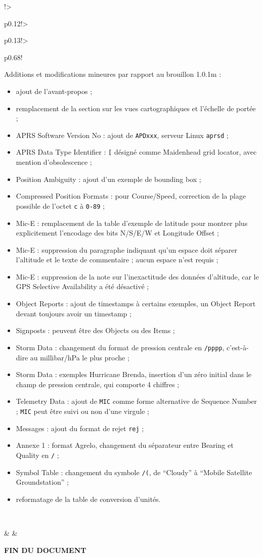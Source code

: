 {\begin{longtable}{!{\vrule}>{\raggedright\arraybackslash}p{0.12\linewidth}!{\vrule}>{\raggedright\arraybackslash}p{0.13\linewidth}!{\vrule}>{\raggedright\arraybackslash}p{0.68\linewidth}!{\vrule}}
\begin{minipage}[t]{\linewidth}
Additions et modifications mineures par rapport au brouillon 1.0.1m :
\begin{itemize}
\setlength{\itemsep}{0pt}
\setlength{\parsep}{0pt}
\setlength{\topsep}{2pt}
\item ajout de l'avant-propos ; 
\item remplacement de la section sur les vues cartographiques et l'échelle de portée ; 
\item APRS Software Version No : ajout de \texttt{APDxxx}, serveur Linux \texttt{aprsd} ; 
\item APRS Data Type Identifier : \texttt{[} désigné comme Maidenhead grid locator, avec mention d'obsolescence ; 
\item Position Ambiguity : ajout d'un exemple de bounding box ; 
\item Compressed Position Formats : pour Course/Speed, correction de la plage possible de l'octet \texttt{c} à \texttt{0-89} ; 
\item Mic-E : remplacement de la table d'exemple de latitude pour montrer plus explicitement l'encodage des bits N/S/E/W et Longitude Offset ; 
\item Mic-E : suppression du paragraphe indiquant qu'un espace doit séparer l'altitude et le texte de commentaire ; aucun espace n'est requis ; 
\item Mic-E : suppression de la note sur l'inexactitude des données d'altitude, car le GPS Selective Availability a été désactivé ; 
\item Object Reports : ajout de timestamps à certains exemples, un Object Report devant toujours avoir un timestamp ; 
\item Signposts : peuvent être des Objects ou des Items ; 
\item Storm Data : changement du format de pression centrale en \texttt{/pppp}, c'est-à-dire au millibar/hPa le plus proche ; 
\item Storm Data : exemples Hurricane Brenda, insertion d'un zéro initial dans le champ de pression centrale, qui comporte 4 chiffres ; 
\item Telemetry Data : ajout de \texttt{MIC} comme forme alternative de Sequence Number ; \texttt{MIC} peut être suivi ou non d'une virgule ; 
\item Messages : ajout du format de rejet \texttt{rej} ; 
\item Annexe 1 : format Agrelo, changement du séparateur entre Bearing et Quality en \texttt{/} ; 
\item Symbol Table : changement du symbole \texttt{/(}, de ``Cloudy'' à ``Mobile Satellite Groundstation'' ; 
\item reformatage de la table de conversion d'unités. 
\end{itemize}
\end{minipage}
\\
\rule{0pt}{1.6ex} & & \\
\hline
\end{longtable}
}
\begin{center}
\sffamily\bfseries FIN DU DOCUMENT
\end{center}
